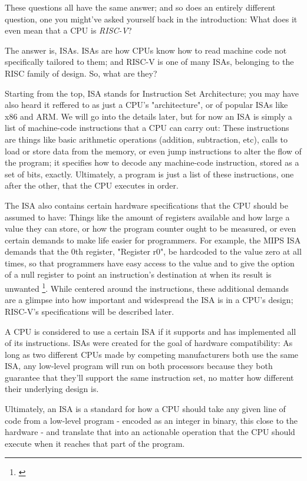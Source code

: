 \documentclass[12pt,twoside]{reedthesis}
\begin{document}
These questions all have the same answer; and so does an entirely different question, one you might've asked yourself back in the introduction: What does it even mean that a CPU is \textit{RISC-V}?

The answer is, ISAs. ISAs are how CPUs know how to read machine code not specifically tailored to them; and RISC-V is one of many ISAs, belonging to the RISC family of design. So, what are they?

Starting from the top, ISA stands for Instruction Set Architecture; you may have also heard it reffered to as just a CPU's "architecture", or of popular ISAs like x86 and ARM. We will go into the details later, but for now an ISA is simply a list of machine-code instructions that a CPU can carry out: These instructions are things like basic arithmetic operations (addition, subtraction, etc), calls to load or store data from the memory, or even jump instructions to alter the flow of the program; it specifies how to decode any machine-code instruction, stored as a set of bits, exactly. Ultimately, a program is just a list of these instructions, one after the other, that the CPU executes in order.

The ISA also contains certain hardware specifications that the CPU should be assumed to have: Things like the amount of registers available and how large a value they can store, or how the program counter ought to be measured, or even certain demands to make life easier for programmers. For example, the MIPS ISA demands that the 0th register, "Register r0", be hardcoded to the value zero at all times, so that programmers have easy access to the value and to give the option of a null register to point an instruction's destination at when its result is unwanted \footnote{\cite{waterman}}. While centered around the instructions, these additional demands are a glimpse into how important and widespread the ISA is in a CPU's design; RISC-V's specifications will be described later.

A CPU is considered to use a certain ISA if it supports and has implemented all of its instructions. ISAs were created for the goal of hardware compatibility: As long as two different CPUs made by competing manufacturers both use the same ISA, any low-level program will run on both processors because they both guarantee that they'll support the same instruction set, no matter how different their underlying design is.

Ultimately, an ISA is a standard for how a CPU should take any given line of code from a low-level program - encoded as an integer in binary, this close to the hardware - and translate that into an actionable operation that the CPU should execute when it reaches that part of the program.
\end{document}
